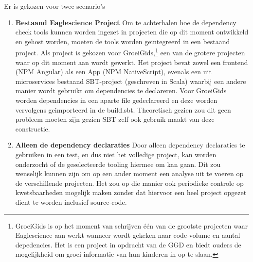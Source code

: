 Er is gekozen voor twee scenario's
\begin{enumerate}
    \item \textbf{Bestaand Eaglescience Project} Om te achterhalen hoe de dependency check tools kunnen worden ingezet in projecten die op dit moment ontwikkeld en gehost worden, moeten de tools worden geintegreerd in een bestaand project. Als project is gekozen voor GroeiGids,\footnote{GroeiGids is op het moment van schrijven één van de grootste projecten waar Eaglescience aan werkt wanneer wordt gekeken naar code-volume en aantal depedencies. Het is een project in opdracht van de GGD en biedt ouders de mogelijkheid om groei informatie van hun kinderen in op te slaan.} een van de grotere projecten waar op dit moment aan wordt gewerkt. Het project bevat zowel een frontend (NPM Angular) als een App (NPM NativeScript), evenals een uit microservices bestaand SBT-project (geschreven in Scala) waarbij een andere manier wordt gebruikt om dependencies te declareren. Voor GroeiGids worden dependencies in een aparte file gedeclareerd en deze worden vervolgens geimporteerd in de build.sbt. Theoretisch gezien zou dit geen probleem moeten zijn gezien SBT zelf ook gebruik maakt van deze constructie.

    \item \textbf{Alleen de dependency declaraties} Door alleen dependency declaraties te gebruiken in een test, en dus niet het volledige project, kan worden onderzocht of de geselecteerde tooling hiermee om kan gaan. Dit zou wenselijk kunnen zijn om op een ander moment een analyse uit te voeren op de verschillende projecten. Het zou op die manier ook periodieke controle op kwetsbaarheden mogelijk maken zonder dat hiervoor een heel project opgezet dient te worden inclusief source-code.
\end{enumerate}

